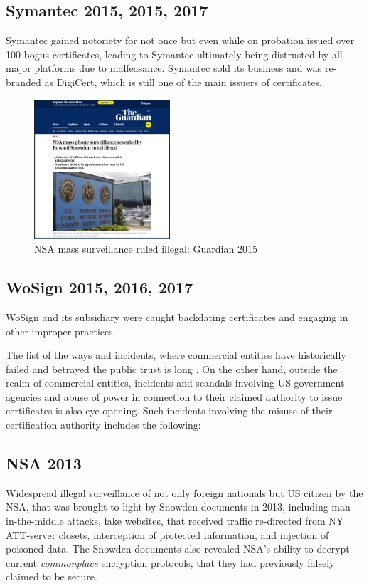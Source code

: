\documentclass[twoside,twocolumn]{article}
\begin{document}
\subsection*{Symantec 2015, 2015, 2017}
Symantec gained notoriety for not once but even while on probation issued over 100 bogus certificates, leading to 
Symantec ultimately being distrusted by all major platforms due to malfeasance. 
Symantec sold its business and was re-branded as DigiCert,
which is still one of the main issuers of certificates.\cite{digicert}

\begin{figure}
\centering
  \includegraphics[width=0.45\textwidth]{i/illegal.png}
  \caption{NSA mass surveillance ruled illegal: Guardian 2015
  }
\end{figure}



\subsection*{WoSign 2015, 2016, 2017}
WoSign and its subsidiary were caught backdating certificates and engaging in other improper practices.\cite{CAfailure}


The list of the ways and incidents, where commercial entities have historically failed and betrayed the public trust is long \cite{CAfailure} \cite{CAfailure2}.
On the other hand, outside the realm of commercial entities,
incidents and scandals involving US government agencies and abuse of power in connection to their claimed
authority to issue certificates is also eye-opening.
Such incidents involving the misuse of their certification authority includes the following:


\subsection*{NSA 2013}
Widespread illegal surveillance of not only foreign nationals but US citizen by the NSA, that was brought to light by Snowden documents in 2013,
including man-in-the-middle attacks,
fake websites,
that received traffic re-directed from NY ATT-server closets,
interception of protected information,
and injection of poisoned data.
The Snowden documents also revealed NSA's ability to decrypt current \textit{commonplace}
encryption protocols, that they had previously falsely claimed to be secure.\cite{snowden}
\end{document}

